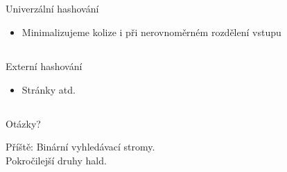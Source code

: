 \documentclass{beamer}
\begin{document}
\subsection{}
\begin{frame}{Univerzální hashování}
\begin{itemize}
\item Minimalizujeme kolize i při nerovnoměrném rozdělení vstupu
\end{itemize}
\end{frame}

\subsection{}
\begin{frame}{Externí hashování}
\begin{itemize}
\item Stránky atd.
\end{itemize}
\end{frame}

\subsection{}
\begin{frame}{Otázky?}
\begin{center}
Příště: Binární vyhledávací stromy. \\ Pokročilejší druhy hald.
\end{center}
\end{frame}

\subsection{}
\end{document}

